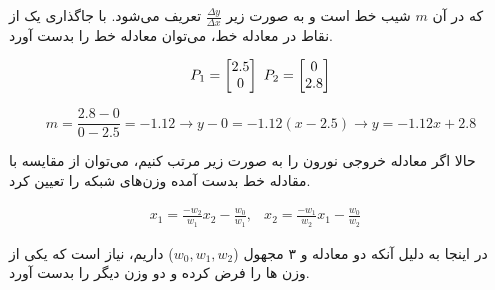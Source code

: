 \begin{enumerate}
\begin{qsolve}
		که در آن $m$ شیب خط است و به صورت زیر $\frac{\Delta y}{\Delta x}$ تعریف می‌شود. با جاگذاری یک از نقاط در معادله خط، می‌توان معادله خط را بدست آورد.
		
		$$
			P_1=\begin{bmatrix}          
				2.5\\
				0
				
			\end{bmatrix} \\\       P_2=\begin{bmatrix}          
				0\\
				2.8
				
			\end{bmatrix}
		$$
		
		$$
			m=\frac{2.8-0}{0-2.5}=-1.12 \rightarrow y-0=-1.12(x-2.5) \rightarrow \boxed{y=-1.12x+2.8}
		$$
		
		حالا اگر معادله خروجی نورون را به صورت زیر مرتب کنیم، می‌توان از مقایسه با مقادله خط بدست آمده وزن‌های شبکه را تعیین کرد.
		
		\begin{eqnarray*}
			x_1=\frac{-w_2}{w_1}x_2-\frac{w_0}{w_1},
			&x_2=\frac{-w_1}{w_2}x_1-\frac{w_0}{w_2}&
		\end{eqnarray*}

		
		در اینجا به دلیل آنکه دو معادله و ۳ مجهول ($w_0,w_1,w_2$) داریم، نیاز است که یکی از وزن ها را فرض کرده و دو وزن دیگر را بدست آورد.
		
%
%
%			
%
%


		

\end{qsolve}
\end{enumerate}
